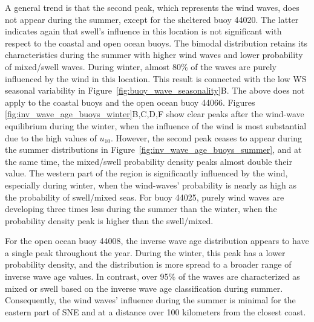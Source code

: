 A general trend is that the second peak, which represents the wind waves, does not appear during the summer, except for the sheltered buoy 44020. The latter indicates again that swell's influence in this location is not significant with respect to the coastal and open ocean buoys. The bimodal distribution retains its characteristics during the summer with higher wind waves and lower probability of mixed/swell waves. During winter, almost 80\% of the waves are purely influenced by the wind in this location. This result is connected with the low WS seasonal variability in Figure~\ref{fig:buoy_wave_seasonality}B. The above does not apply to the coastal buoys and the open ocean buoy 44066. Figures \ref{fig:inv_wave_age_buoys_winter}B,C,D,F show clear peaks after the wind-wave equilibrium during the winter, when the influence of the wind is most substantial due to the high values of $u_{10}$. However, the second peak ceases to appear during the summer distributions in Figure~\ref{fig:inv_wave_age_buoys_summer}, and at the same time, the mixed/swell probability density peaks almost double their value. The western part of the region is significantly influenced by the wind, especially during winter, when the wind-waves' probability is nearly as high as the probability of swell/mixed seas. For buoy 44025, purely wind waves are developing three times less during the summer than the winter, when the probability density peak is higher than the swell/mixed.


For the open ocean buoy 44008, the inverse wave age distribution appears to have a single peak throughout the year. During the winter, this peak has a lower probability density, and the distribution is more spread to a broader range of inverse wave age values. In contrast, over 95\% of the waves are characterized as mixed or swell based on the inverse wave age classification during summer. Consequently, the wind waves' influence during the summer is minimal for the eastern part of SNE and at a distance over 100 kilometers from the closest coast. 




